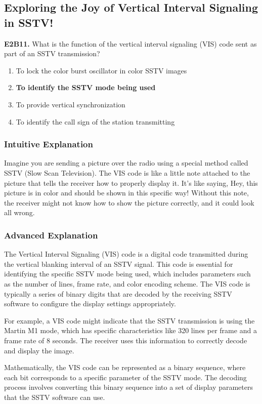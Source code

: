 \subsection{Exploring the Joy of Vertical Interval Signaling in SSTV!}
\label{sec:E2B11}

\begin{tcolorbox}[colback=gray!10!white,colframe=black!75!black,title=E2B11]
\textbf{E2B11.} What is the function of the vertical interval signaling (VIS) code sent as part of an SSTV transmission?
\begin{enumerate}[label=\Alph*.]
    \item To lock the color burst oscillator in color SSTV images
    \item \textbf{To identify the SSTV mode being used}
    \item To provide vertical synchronization
    \item To identify the call sign of the station transmitting
\end{enumerate}
\end{tcolorbox}

\subsubsection{Intuitive Explanation}
Imagine you are sending a picture over the radio using a special method called SSTV (Slow Scan Television). The VIS code is like a little note attached to the picture that tells the receiver how to properly display it. It’s like saying, Hey, this picture is in color and should be shown in this specific way! Without this note, the receiver might not know how to show the picture correctly, and it could look all wrong.

\subsubsection{Advanced Explanation}
The Vertical Interval Signaling (VIS) code is a digital code transmitted during the vertical blanking interval of an SSTV signal. This code is essential for identifying the specific SSTV mode being used, which includes parameters such as the number of lines, frame rate, and color encoding scheme. The VIS code is typically a series of binary digits that are decoded by the receiving SSTV software to configure the display settings appropriately.

For example, a VIS code might indicate that the SSTV transmission is using the Martin M1 mode, which has specific characteristics like 320 lines per frame and a frame rate of 8 seconds. The receiver uses this information to correctly decode and display the image.

Mathematically, the VIS code can be represented as a binary sequence, where each bit corresponds to a specific parameter of the SSTV mode. The decoding process involves converting this binary sequence into a set of display parameters that the SSTV software can use.

